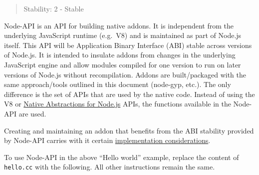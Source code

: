 \begin{quote}
Stability: 2 - Stable
\end{quote}

Node-API is an API for building native addons. It is independent from
the underlying JavaScript runtime (e.g.~V8) and is maintained as part of
Node.js itself. This API will be Application Binary Interface (ABI)
stable across versions of Node.js. It is intended to insulate addons
from changes in the underlying JavaScript engine and allow modules
compiled for one version to run on later versions of Node.js without
recompilation. Addons are built/packaged with the same approach/tools
outlined in this document (node-gyp, etc.). The only difference is the
set of APIs that are used by the native code. Instead of using the V8 or
\href{https://github.com/nodejs/nan}{Native Abstractions for Node.js}
APIs, the functions available in the Node-API are used.

Creating and maintaining an addon that benefits from the ABI stability
provided by Node-API carries with it certain
\href{n-api.md\#implications-of-abi-stability}{implementation
considerations}.

To use Node-API in the above ``Hello world'' example, replace the
content of \texttt{hello.cc} with the following. All other instructions
remain the same.

